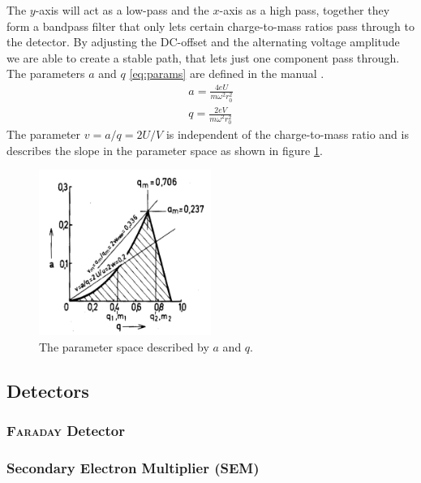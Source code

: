     The $y$-axis will act as a low-pass and the $x$-axis as a high pass, together they form a bandpass filter that only lets certain charge-to-mass ratios pass through to the detector. By adjusting the DC-offset and the alternating voltage amplitude we are able to create a stable path, that lets just one component pass through. The parameters $a$ and $q$ \eqref{eq:params} are defined in the manual \cite{manual}.
    \begin{equation}
        \begin{aligned}
            a = \frac{4eU}{m\omega^2r_0^2} \\
            q = \frac{2eV}{m\omega^2r_0^2}
            \label{eq:params}
        \end{aligned}
    \end{equation}
    The parameter $v=a/q=2U/V$ is independent of the charge-to-mass ratio and is describes the slope in the parameter space as shown in figure \ref{fig:paramspace}.
    \begin{figure}[h!]
    \centering
    \includegraphics[width=0.5\textwidth]{Report/pictures/paramspace.png}
    \caption{The parameter space described by $a$ and $q$. \cite{manual}}
    \label{fig:paramspace}
    \end{figure}
    
    
    
    \subsection{Detectors}
    \subsubsection{{\scshape Faraday} Detector}
    
    \subsubsection{Secondary Electron Multiplier (SEM)}